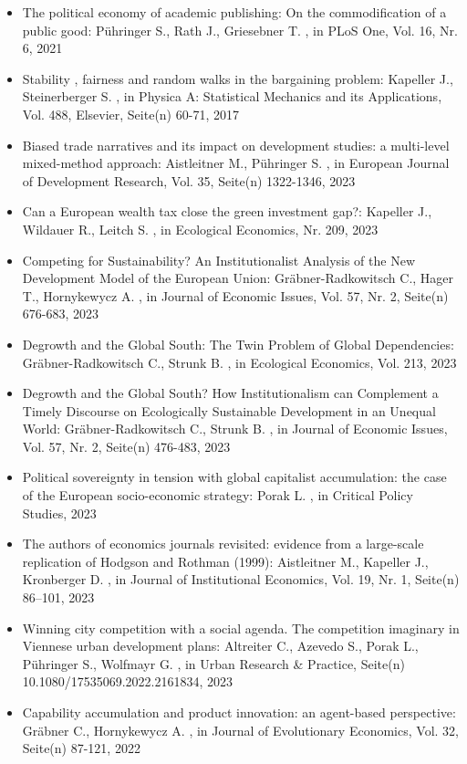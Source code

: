 \begin{itemize}
\item The political economy of academic publishing: On the commodification of a public good: Pühringer S., Rath J., Griesebner T. , in PLoS One, Vol. 16, Nr. 6, 2021
\item Stability , fairness and random walks in the bargaining problem: Kapeller J., Steinerberger S. , in Physica A: Statistical Mechanics and its Applications, Vol. 488, Elsevier, Seite(n) 60-71, 2017
\item Biased trade narratives and its impact on development studies: a multi-level mixed-method approach: Aistleitner M., Pühringer S. , in European Journal of Development Research, Vol. 35, Seite(n) 1322-1346, 2023
\item Can a European wealth tax close the green investment gap?: Kapeller J., Wildauer R., Leitch S. , in Ecological Economics, Nr. 209, 2023
\item Competing for Sustainability? An Institutionalist Analysis of the New Development Model of the European Union: Gräbner-Radkowitsch C., Hager T., Hornykewycz A. , in Journal of Economic Issues, Vol. 57, Nr. 2, Seite(n) 676-683, 2023
\item Degrowth and the Global South: The Twin Problem of Global Dependencies: Gräbner-Radkowitsch C., Strunk B. , in Ecological Economics, Vol. 213, 2023
\item Degrowth and the Global South? How Institutionalism can Complement a Timely Discourse on Ecologically Sustainable Development in an Unequal World: Gräbner-Radkowitsch C., Strunk B. , in Journal of Economic Issues, Vol. 57, Nr. 2, Seite(n) 476-483, 2023
\item Political sovereignty in tension with global capitalist accumulation: the case of the European socio-economic strategy: Porak L. , in Critical Policy Studies, 2023
\item The authors of economics journals revisited: evidence from a large-scale replication of Hodgson and Rothman (1999): Aistleitner M., Kapeller J., Kronberger D. , in Journal of Institutional Economics, Vol. 19, Nr. 1, Seite(n) 86–101, 2023
\item Winning city competition with a social agenda. The competition imaginary in Viennese urban development plans: Altreiter C., Azevedo S., Porak L., Pühringer S., Wolfmayr G. , in Urban Research & Practice, Seite(n) 10.1080/17535069.2022.2161834, 2023
\item Capability accumulation and product innovation: an agent-based perspective: Gräbner C., Hornykewycz A. , in Journal of Evolutionary Economics, Vol. 32, Seite(n) 87-121, 2022

\end{itemize}
